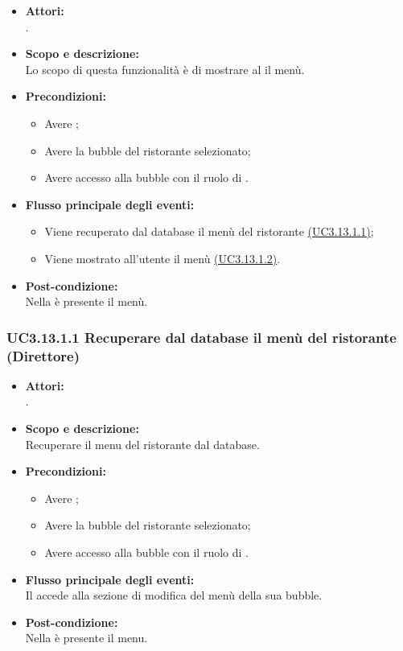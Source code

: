 \begin{itemize}
	\item \textbf{Attori:}
	\\.
	\item \textbf{Scopo e descrizione:} 
	\\Lo scopo di questa funzionalità è di mostrare al  il menù.
	\item \textbf{Precondizioni:}
	\begin{itemize}
		\item Avere ;
		\item Avere la bubble del ristorante selezionato;
		\item Avere accesso alla bubble con il ruolo di .
	\end{itemize}
	\item \textbf{Flusso principale degli eventi:}
	\begin{itemize}
		\item Viene recuperato dal database il menù del ristorante \hyperref[UC3.13.1.1]{(UC3.13.1.1)};
		\item Viene mostrato all’utente il menù \hyperref[UC3.13.1.2]{(UC3.13.1.2)}.
	\end{itemize}
	\item \textbf{Post-condizione:}
	\\Nella {} è presente il menù.
\end{itemize}

\subsubsection{UC3.13.1.1 Recuperare dal database il menù del ristorante (Direttore)} \label{UC3.13.1.1}

\begin{itemize}
	\item \textbf{Attori:}
	\\.
	\item \textbf{Scopo e descrizione:} 
	\\Recuperare il menu del ristorante dal database.
	\item \textbf{Precondizioni:}
	\begin{itemize}
		\item Avere ;
		\item Avere la bubble del ristorante selezionato;
		\item Avere accesso alla bubble con il ruolo di .
	\end{itemize}
	\item \textbf{Flusso principale degli eventi:}
	\\Il {} accede alla sezione di modifica del menù della sua bubble.
	\item \textbf{Post-condizione:}
	\\Nella {} è presente il menu.
\end{itemize}


